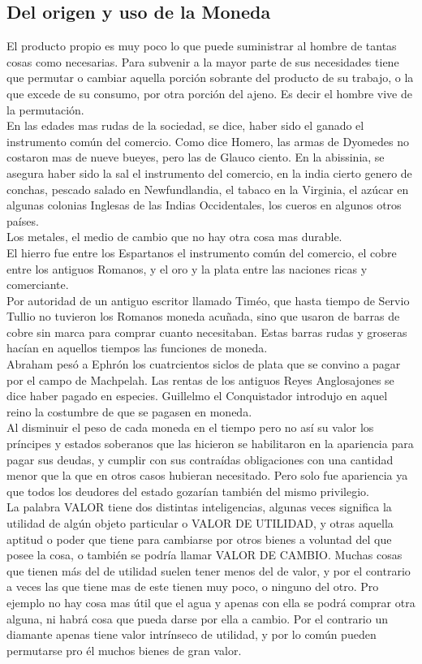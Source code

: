 \documentclass[10pt]{article}
\begin{document}
\begin{multicols}{2}
\section*{Del origen y uso de la Moneda}
El producto propio es muy poco lo que puede suministrar al hombre de tantas cosas como necesarias. Para subvenir a la mayor parte de sus necesidades tiene que permutar o cambiar aquella porción sobrante del producto de su trabajo, o la que excede de su consumo, por otra porción del ajeno. Es decir el hombre vive de la permutación.\\
En las edades mas rudas de la sociedad, se dice, haber sido el ganado el instrumento común del comercio. Como dice Homero, las armas de Dyomedes no costaron mas de nueve bueyes, pero las de Glauco ciento. En la abissinia, se asegura haber sido la sal el instrumento del comercio, en la india cierto genero de conchas, pescado salado en Newfundlandia, el tabaco en la Virginia, el azúcar en algunas colonias Inglesas de las Indias Occidentales, los cueros en algunos otros países.\\
Los metales, el medio de cambio que no hay otra cosa mas durable. \\
El hierro fue entre los Espartanos el instrumento común del comercio, el cobre entre los antiguos Romanos, y el oro y la plata entre las naciones ricas y comerciante.\\
Por autoridad de un antiguo escritor  llamado Timéo, que hasta tiempo de Servio Tullio no tuvieron los Romanos moneda acuñada, sino que usaron de barras de cobre sin marca para comprar cuanto necesitaban. Estas barras rudas y groseras hacían en aquellos tiempos las funciones de moneda.\\
{\color{blue} Abraham pesó a Ephrón los cuatrcientos siclos de plata que se convino a pagar por el campo de Machpelah}. Las rentas de los antiguos Reyes Anglosajones se dice haber pagado en especies. Guillelmo el Conquistador introdujo en aquel reino la costumbre de que se pagasen en moneda. \\
Al disminuir el peso de cada moneda en el tiempo pero no así su valor los príncipes y estados soberanos que las hicieron se habilitaron en la apariencia para pagar sus deudas, y cumplir con sus contraídas obligaciones con una cantidad menor que la que en otros casos hubieran necesitado. Pero solo fue apariencia ya que todos los deudores del estado gozarían también del mismo privilegio. \\
{\color{blue} La palabra VALOR tiene dos distintas inteligencias, algunas veces significa la utilidad de algún objeto particular o VALOR DE UTILIDAD, y otras aquella aptitud o poder que tiene para cambiarse por otros bienes a voluntad del que posee la cosa, o también se podría llamar  VALOR DE CAMBIO.} Muchas cosas que tienen más del de utilidad suelen tener menos del de valor, y por el contrario a veces las que tiene mas de este tienen muy poco, o ninguno del otro. Pro ejemplo no hay cosa mas útil que el agua y apenas con ella se podrá comprar otra alguna, ni habrá cosa que pueda darse por ella a cambio. Por el contrario un diamante apenas tiene valor intrínseco de utilidad, y por lo común pueden permutarse pro él muchos bienes de gran valor.

\end{multicols}
\end{document}
